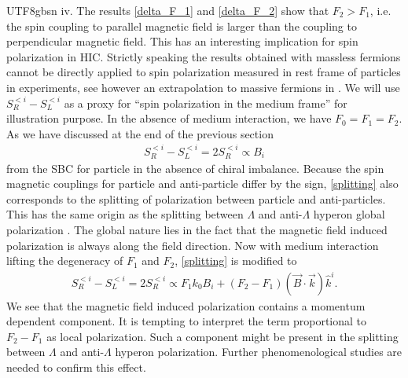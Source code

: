 \documentclass[11pt]{article}\def\baselinestretch{1.4}
\def\L{{\Lambda}}
\begin{document}
\begin{CJK}{UTF8}{gbsn}
% 
iv. The results \eqref{delta_F_1} and \eqref{delta_F_2} show that $F_2>F_1$, i.e. the spin coupling to parallel magnetic field is larger than the coupling to perpendicular magnetic field. This has an interesting implication for spin polarization in HIC. Strictly speaking the results obtained with massless fermions cannot be directly applied to spin polarization measured in rest frame of particles in experiments, see however an extrapolation to massive fermions in \cite{Yi:2021ryh}. We will use $S_R^{<i}-S_L^{<i}$ as a proxy for ``spin polarization in the medium frame'' for illustration purpose. In the absence of medium interaction, we have $F_0=F_1=F_2$. As we have discussed at the end of the previous section
\begin{align}\label{splitting}
S_R^{<i}-S_L^{<i}=2S_R^{<i}\propto B_i
\end{align}
from the SBC for particle in the absence of chiral imbalance. Because the spin magnetic couplings for particle and anti-particle differ by the sign, \eqref{splitting} also corresponds to the splitting of polarization between particle and anti-particles. This has the same origin as the splitting between $\L$ and anti-$\L$ hyperon global polarization \cite{Becattini:2016gvu}. The global nature lies in the fact that the magnetic field induced polarization is always along the field direction. Now with medium interaction lifting the degeneracy of $F_1$ and $F_2$, \eqref{splitting} is modified to
\begin{align}\label{splitting2}
S_R^{<i}-S_L^{<i}=2S_R^{<i}\propto F_1k_0B_i+(F_2-F_1)(\vec{B}\cdot\vec{k})\hat{k}^i.
\end{align}
We see that the magnetic field induced polarization contains a momentum dependent component. It is tempting to interpret the term proportional to $F_2-F_1$ as local polarization. Such a component might be present in the splitting between $\L$ and anti-$\L$ hyperon polarization. Further phenomenological studies are needed to confirm this effect.




\end{CJK}
\end{document}
